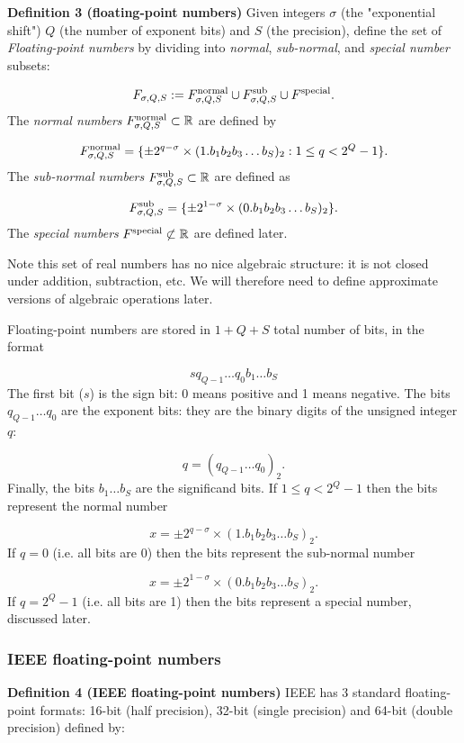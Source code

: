 \documentclass[12pt,a4paper]{article}
\begin{document}
\textbf{Definition 3 (floating-point numbers)} Given integers $\ensuremath{\sigma}$ (the "exponential shift") $Q$ (the number of exponent bits) and $S$ (the precision), define the set of \emph{Floating-point numbers} by dividing into \emph{normal}, \emph{sub-normal}, and \emph{special number} subsets:

\[
F_{\ensuremath{\sigma},Q,S} := F^{\rm normal}_{\ensuremath{\sigma},Q,S} \cup F^{\rm sub}_{\ensuremath{\sigma},Q,S} \cup F^{\rm special}.
\]
The \emph{normal numbers} $F^{\rm normal}_{\ensuremath{\sigma},Q,S} \subset {\mathbb R}$ are defined by

\[
F^{\rm normal}_{\ensuremath{\sigma},Q,S} = \{\ensuremath{\pm} 2^{q-\ensuremath{\sigma}} \times (1.b_1b_2b_3\ldots b_S)_2 : 1 \leq q < 2^Q-1 \}.
\]
The \emph{sub-normal numbers} $F^{\rm sub}_{\ensuremath{\sigma},Q,S} \subset {\mathbb R}$ are defined as

\[
F^{\rm sub}_{\ensuremath{\sigma},Q,S} = \{\ensuremath{\pm} 2^{1-\ensuremath{\sigma}} \times (0.b_1b_2b_3\ldots b_S)_2\}.
\]
The \emph{special numbers} $F^{\rm special} \not\subset {\mathbb R}$ are defined later.

Note this set of real numbers has no nice algebraic structure: it is not closed under addition, subtraction, etc. We will therefore need to define approximate versions of algebraic operations later.

Floating-point numbers are stored in $1 + Q + S$ total number of bits, in the format

\[
sq_{Q-1}\ldots q_0 b_1 \ldots b_S
\]
The first bit ($s$) is the sign bit: 0 means positive and 1 means negative. The bits $q_{Q-1}\ldots q_0$ are the exponent bits: they are the binary digits of the unsigned integer $q$:

\[
q = (q_{Q-1}\ldots q_0)_2.
\]
Finally, the bits $b_1\ldots b_S$ are the significand bits. If $1 \leq q < 2^Q-1$ then the bits represent the normal number

\[
x = \ensuremath{\pm} 2^{q-\ensuremath{\sigma}} \times (1.b_1b_2b_3\ldots b_S)_2.
\]
If $q = 0$ (i.e. all bits are 0) then the bits represent the sub-normal number

\[
x = \ensuremath{\pm} 2^{1-\ensuremath{\sigma}} \times (0.b_1b_2b_3\ldots b_S)_2.
\]
If $q = 2^Q-1$  (i.e. all bits are 1) then the bits represent a special number, discussed later.

\subsubsection{IEEE floating-point numbers}
\textbf{Definition 4 (IEEE floating-point numbers)} IEEE has 3 standard floating-point formats: 16-bit (half precision), 32-bit (single precision) and 64-bit (double precision) defined by:
\end{document}
